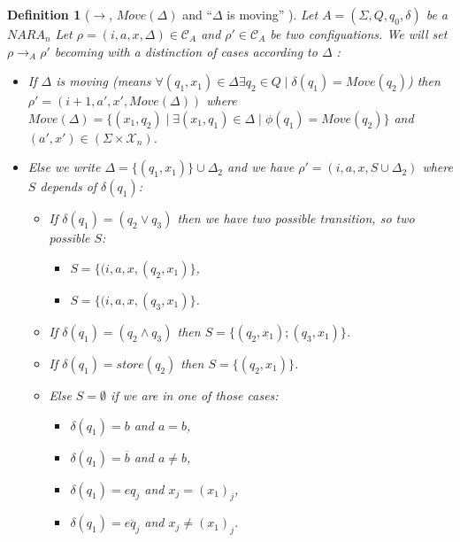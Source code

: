 \documentclass[a4paper,10pt]{report}
\newtheorem{df}{Definition}
\newcommand{\C}{\mathcal{C}_{A}}
\newcommand{\X}{\mathcal{X}_{n}}
\begin{document}
\begin{df}[$\rightarrow$, $Move(\Delta)$ and ``$\Delta$ is moving'' ]
  Let $A = (\Sigma ,Q ,q_0, \delta )$ be a $NARA_n$
  Let $\rho = (i,a,x,\Delta) \in \C$ and $\rho' \in \C$ be two configuations.
  We will set  $\rho \rightarrow_A \rho'$  becoming with a distinction of cases according to $\Delta$ : 
   \begin{itemize}
    \item [${\underrightarrow{(a',x')}}_M$ (move)] If $\Delta$ is moving (means $\forall (q_1,x_1) \in \Delta \exists q_2 \in Q \mid \delta(q_1) = Move(q_2)$)
    then $\rho'  = (i+1,a',x',Move(\Delta))$ 
    where $Move(\Delta) = \{(x_1,q_2) \mid \exists (x_1,q_1) \in \Delta \mid \phi(q_1) = Move(q_2)\}$ and $(a',x') \in (\Sigma \times \X)$.

    \item [$\rightarrow_{\epsilon}$ (epsilon)  ] Else we write $\Delta = \{(q_1,x_1)\} \cup \Delta_2$ and we have  $\rho' = (i,a,x,S \cup \Delta_2 )$ where $S$ depends of $\delta(q_1)$:  
    \begin{itemize}
    \item [$\rightarrow_\vee$ (or)] If $\delta(q_1) = (q_2 \vee q_3)$  then we have two possible transition, so two possible $S$:
      \begin{itemize}
	\item $S = \{ (i,a,x,(q_2,x_1)\}$,   
	\item $S = \{(i,a,x,(q_3,x_1) \}$.
      \end{itemize}
    \item [$\rightarrow_\wedge$ (and)] If $\delta(q_1) = (q_2 \wedge q_3)$  then $S = \{(q_2,x_1); (q_3,x_1) \} $.
    \item [$\rightarrow_s$ (store)] If $\delta(q_1) = store(q_2)$  then $S =  \{(q_2,x_1)\}$.
 
    \item [$\rightarrow_c$ (check)] Else $S = \emptyset$ if we are in one of those cases:  
	\begin{itemize}
 	 \item $\delta(q_1) = b$ and $ a= b$,
 	 \item $\delta(q_1) = \overline b$ and $ a \neq b$,
 	 \item $\delta(q_1) = eq_j$ and $x_j = {(x_1)}_j$,
 	 \item $\delta(q_1) = \overline{eq_j}$ and $x_j \neq {(x_1)}_j$.
	\end{itemize}
    \end{itemize}
   

    
   \end{itemize}


\end{df}
\end{document}

